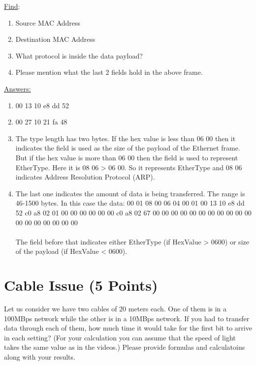 \documentclass{WeSTassignment}
\begin{document}
\underline{Find}:
\begin{enumerate}
\item Source MAC Address
\item Destination MAC Address
\item What protocol is inside the data payload?
\item Please mention what the last 2 fields hold in the above frame.
\end{enumerate}

\underline{Answers:}

\begin{enumerate}
\item 00 13 10 e8 dd 52
\item 00 27 10 21 fa 48
\item The type length has two bytes. If the hex value is less than 06 00 then it indicates the field is used as the size of the payload of the Ethernet frame. But if the hex value is more than 06 00 then the field is used to represent EtherType. Here it is 08 06 > 06 00. So it represents EtherType and 08 06 indicates Address Resolution Protocol (ARP).
\item The last one indicates the amount of data is being transferred. The range is 46-1500 bytes. In this case the data: 00 01 08 00 06 04 00 01 00 13 10 e8 dd 52 c0 a8 02 01 00 00 00 00 00 00 c0 a8 02 67 00 00 00 00 00 00 00 00 00 00 00 00 00 00 00 00 00 00 \\
\\
The field before that indicates either EtherType (if HexValue > 0600) or size of the payload (if HexValue < 0600).

\end{enumerate}


\section{Cable Issue (5 Points)}

Let us consider we have two cables of 20 meters each. One of them is in a 100MBps network while the other is in a 10MBps network. If you had to transfer data through each of them, how much time it would take for the first bit to arrive in each setting? (For your calculation you can assume that the speed of light takes the same value as in the videos.) Please provide formulas and calculatoins along with your results. 
\end{document}
